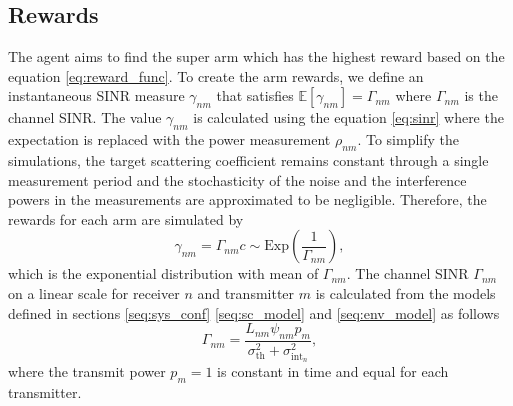 \documentclass[conference]{IEEEtran}
\newcommand{\thnoise}{\sigma^2_{\text{th}}}
\newcommand{\epower}{p_{m}}
\newcommand{\eintnoise}{\sigma^2_{\text{int}_{n}}}
\newcommand{\esinr}{\gamma_{{nm}}}
\newcommand{\esinrexp}{\Gamma_{nm}}
\newcommand{\epl}{L_{nm}}
\newcommand{\ercs}{\psi_{nm}}
\newcommand{\E}[1]{\mathbb{E}\left[ #1 \right]}
\newcommand{\esp}{\rho_{nm}}
\begin{document}
\subsection{Rewards}

The agent aims to find the super arm which has the highest reward based on the equation \eqref{eq:reward_func}. 
To create the arm rewards, we define an instantaneous SINR measure $\esinr$ that satisfies $\E{\esinr} = \esinrexp$ where $\esinrexp$ is the channel SINR. 
The value $\esinr$ is calculated using the equation \eqref{eq:sinr} where the expectation is replaced with the power measurement $\esp$. 
To simplify the simulations, 
the target scattering coefficient remains constant through a single measurement period and the stochasticity of the noise and the interference powers in the measurements are approximated to be negligible. 
Therefore, the rewards for each arm are simulated by
\begin{equation}
    \esinr  = \esinrexp c \sim \text{Exp}\left(\frac{1}{\esinrexp}\right),
\end{equation}
which is the exponential distribution with mean of $\esinrexp$.
The channel SINR $\esinrexp$ on a linear scale for receiver $n$ and transmitter $m$ is calculated from the models defined in sections \ref{seq:sys_conf} \ref{seq:sc_model} and \ref{seq:env_model} as follows
\begin{equation}
    \esinrexp = \frac{\epl \ercs \epower}{\thnoise + \eintnoise},
\end{equation}
where the transmit power $\epower=1$ is constant in time and equal for each transmitter.
\end{document}
